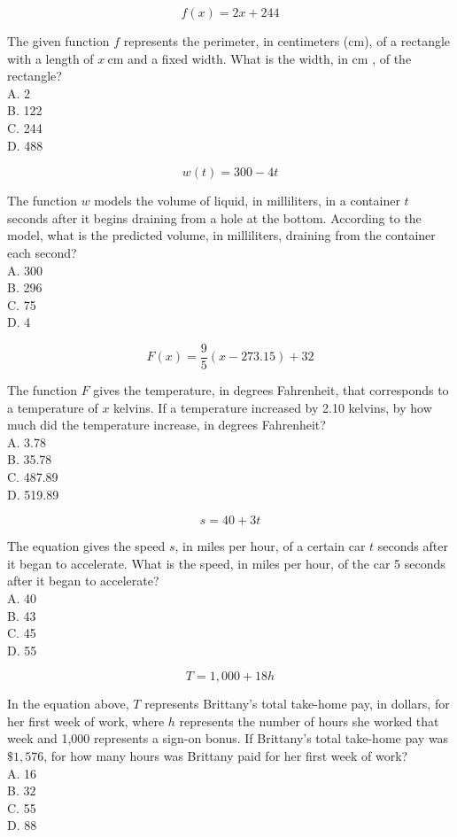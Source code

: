 $$
f(x)=2 x+244
$$

The given function $f$ represents the perimeter, in centimeters (cm), of a rectangle with a length of $x \mathrm{~cm}$ and a fixed width. What is the width, in cm , of the rectangle?\\
A. 2\\
B. 122\\
C. 244\\
D. 488

$$
w(t)=300-4 t
$$

The function $w$ models the volume of liquid, in milliliters, in a container $t$ seconds after it begins draining from a hole at the bottom. According to the model, what is the predicted volume, in milliliters, draining from the container each second?\\
A. 300\\
B. 296\\
C. 75\\
D. 4

$$
F(x)=\frac{9}{5}(x-273.15)+32
$$

The function $F$ gives the temperature, in degrees Fahrenheit, that corresponds to a temperature of $x$ kelvins. If a temperature increased by 2.10 kelvins, by how much did the temperature increase, in degrees Fahrenheit?\\
A. 3.78\\
B. 35.78\\
C. 487.89\\
D. 519.89

$$
s=40+3 t
$$

The equation gives the speed $s$, in miles per hour, of a certain car $t$ seconds after it began to accelerate. What is the speed, in miles per hour, of the car 5 seconds after it began to accelerate?\\
A. 40\\
B. 43\\
C. 45\\
D. 55

$$
T=1,000+18 h
$$

In the equation above, $T$ represents Brittany's total take-home pay, in dollars, for her first week of work, where $h$ represents the number of hours she worked that week and 1,000 represents a sign-on bonus. If Brittany's total take-home pay was $\$ 1,576$, for how many hours was Brittany paid for her first week of work?\\
A. 16\\
B. 32\\
C. 55\\
D. 88

